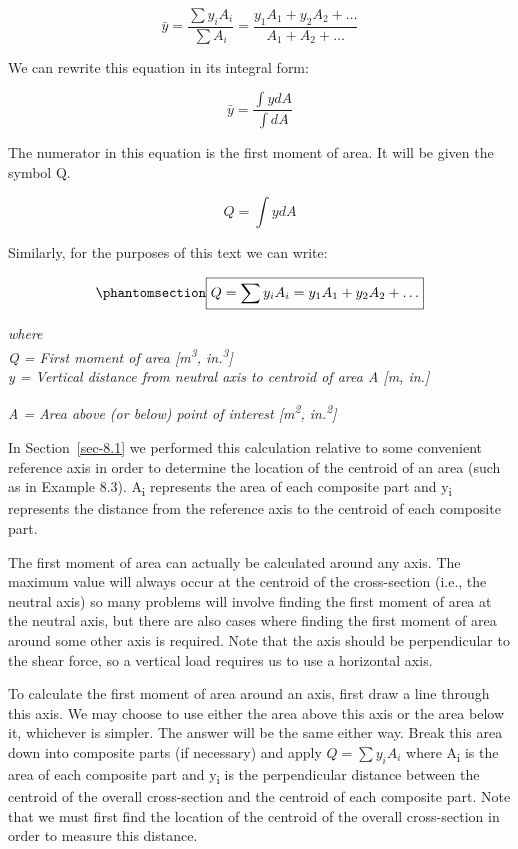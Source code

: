 \documentclass[
  letterpaper,
  DIV=11,
  numbers=noendperiod]{scrreprt}
\theoremstyle{definition}
\theoremstyle{remark}
\begin{document}
\[
\bar{y}=\frac{\sum y_i A_i}{\sum A_i}=\frac{y_1 A_1+y_2 A_2+\ldots}{A_1+A_2+\ldots}
\]

We can rewrite this equation in its integral form:

\[
\bar{y}=\frac{\int y d A}{\int d A}
\]

The numerator in this equation is the first moment of area. It will be
given the symbol Q.

\[
Q=\int y d A
\]

Similarly, for the purposes of this text we can write:

\begin{equation}\phantomsection\label{eq-10.1}{
\boxed{Q=\sum y_i A_i=y_1 A_1+y_2 A_2+\ldots}
}\end{equation}

\emph{where}\\
\emph{Q = First moment of area {[}m\textsuperscript{3},
in.\textsuperscript{3}{]}}\\
\emph{y = Vertical distance from neutral axis to centroid of area A
{[}m, in.{]}}

\emph{A = Area above (or below) point of interest
{[}m\textsuperscript{2}, in.\textsuperscript{2}{]}}

In Section~\ref{sec-8.1} we performed this calculation relative to some
convenient reference axis in order to determine the location of the
centroid of an area (such as in Example 8.3). A\textsubscript{i}
represents the area of each composite part and y\textsubscript{i}
represents the distance from the reference axis to the centroid of each
composite part.

The first moment of area can actually be calculated around any axis. The
maximum value will always occur at the centroid of the cross-section
(i.e., the neutral axis) so many problems will involve finding the first
moment of area at the neutral axis, but there are also cases where
finding the first moment of area around some other axis is required.
Note that the axis should be perpendicular to the shear force, so a
vertical load requires us to use a horizontal axis.

To calculate the first moment of area around an axis, first draw a line
through this axis. We may choose to use either the area above this axis
or the area below it, whichever is simpler. The answer will be the same
either way. Break this area down into composite parts (if necessary) and
apply \(Q=\sum y_i A_i\) where A\textsubscript{i} is the area of each
composite part and y\textsubscript{i} is the perpendicular distance
between the centroid of the overall cross-section and the centroid of
each composite part. Note that we must first find the location of the
centroid of the overall cross-section in order to measure this distance.
\end{document}

